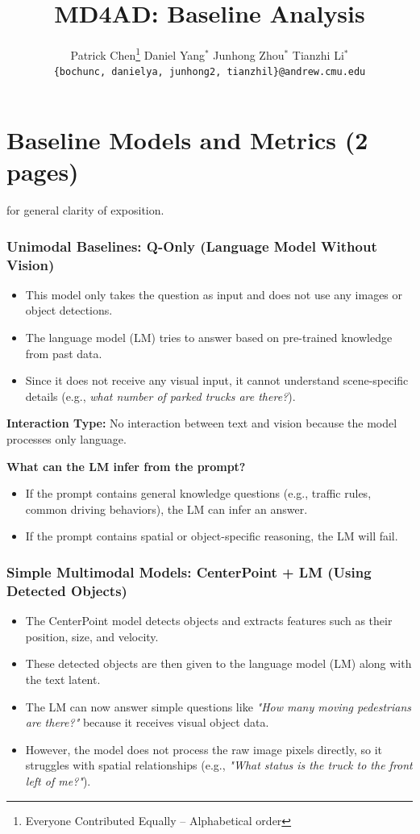 \documentclass{article} %
\title{MD4AD: Baseline Analysis}
\author{
	Patrick Chen\thanks{\hspace{4pt}Everyone Contributed Equally -- Alphabetical order} \hspace{2em} Daniel Yang$^*$ \hspace{2em} Junhong Zhou$^*$ \hspace{2em} Tianzhi Li$^*$ \\
	\texttt{\{bochunc, danielya, junhong2, tianzhil\}@andrew.cmu.edu}
}
\date{}
\begin{document}
	\maketitle
	
	
	\section{Baseline Models and Metrics (2 pages)}
	 for general clarity of exposition. \\
	
	\subsubsection{\textbf{Unimodal Baselines: Q-Only (Language Model Without Vision)}}
	\begin{itemize}
		\item This model only takes the question as input and does not use any images or object detections.
		\item The language model (LM) tries to answer based on pre-trained knowledge from past data.
		\item Since it does not receive any visual input, it cannot understand scene-specific details (e.g., \textit{what number of parked trucks are there?}).
	\end{itemize}
	
	\noindent \textbf{Interaction Type:} No interaction between text and vision because the model processes only language.
	
	\noindent \textbf{What can the LM infer from the prompt?}
	\begin{itemize}
		\item If the prompt contains general knowledge questions (e.g., traffic rules, common driving behaviors), the LM can infer an answer.
		\item If the prompt contains spatial or object-specific reasoning, the LM will fail.
	\end{itemize}
	
	
	\subsubsection{\textbf{Simple Multimodal Models: CenterPoint + LM (Using Detected Objects)}}
	\begin{itemize}
		\item The CenterPoint model detects objects and extracts features such as their position, size, and velocity.
		\item These detected objects are then given to the language model (LM) along with the text latent.
		\item The LM can now answer simple questions like \textit{"How many moving pedestrians are there?"} because it receives visual object data.
		\item However, the model does not process the raw image pixels directly, so it struggles with spatial relationships (e.g., \textit{"What status is the truck to the front left of me?"}).
	\end{itemize}
	
\end{document}
